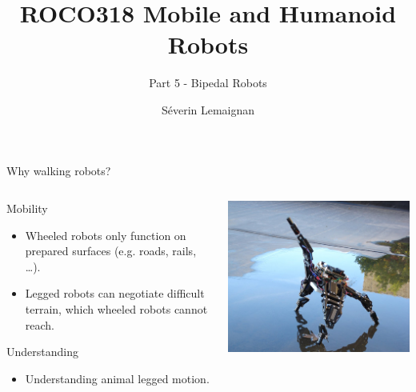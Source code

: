 \documentclass[compress]{beamer}
\title{ROCO318 \newline Mobile and Humanoid Robots}
\subtitle{Part 5 - Bipedal Robots}
\date{}
\author{Séverin Lemaignan}
\institute{Centre for Neural Systems and Robotics\\{\bf Plymouth University}}
\begin{document}

\maketitle


\begin{frame}{Why walking robots?}
    \begin{columns}
        \begin{column}{0.5\linewidth}
    Mobility

    \begin{itemize}

        \item Wheeled robots only function on prepared surfaces (e.g. roads, rails,
            \ldots{}).
        \item Legged robots can negotiate difficult terrain, which wheeled robots
            cannot reach.
    \end{itemize}

    Understanding

    \begin{itemize}

        \item Understanding animal legged motion.
    \end{itemize}
            
        \end{column}
        \begin{column}{0.5\linewidth}
            \begin{center}
                \includegraphics[width=0.8\linewidth]{image1}


\end{center}
\end{column}
\end{columns}
\end{frame}
\end{document}
